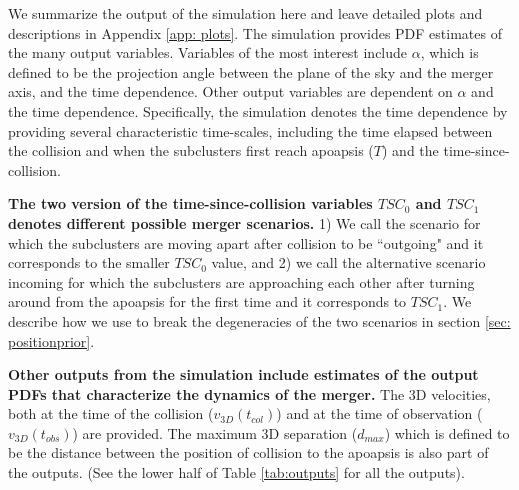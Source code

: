 We summarize the output of the simulation here and leave detailed
plots and descriptions in Appendix \ref{app: plots}. The simulation provides PDF estimates of the many output variables. Variables
of the most interest include $\alpha$, which is defined to be the projection
angle between the plane of the sky and the merger axis, and the time
dependence. Other output variables are dependent on $\alpha$ and the time
dependence. Specifically, the simulation denotes the time dependence by
providing several characteristic time-scales, including the time
elapsed between the collision and when the subclusters first reach apoapsis
($T$) and the time-since-collision.

\textbf{The two version of the time-since-collision variables $TSC_0$ and
$TSC_1$ denotes different possible merger scenarios.} 1) We call the scenario for which the subclusters are
moving apart after collision to be ``outgoing" and it corresponds to the
smaller $TSC_0$ value, and 2) we call the alternative scenario 
incoming for which the subclusters are approaching each other after turning
around from the apoapsis for the first time and it corresponds to $TSC_1$.
We describe how we use to break the degeneracies of the two scenarios in
section \ref{sec: positionprior}. 
 
\textbf{Other outputs from the simulation include estimates of the
output PDFs that characterize the dynamics of the merger. 
} The 3D velocities, both at the time of the collision
($v_{3D}(t_{col})$) and at the time of observation ($v_{3D}(t_{obs})$) are
provided. The maximum 3D separation ($d_{max}$) which is defined to be the
distance between the position of collision to the apoapsis is also part of
the outputs. (See the lower half of Table \ref{tab:outputs} for all the outputs).
%

